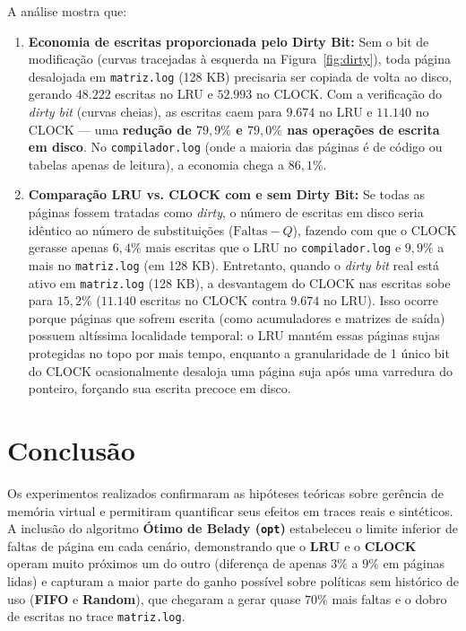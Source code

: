 \documentclass[12pt,a4paper]{article}
\begin{document}
A análise mostra que:
\begin{enumerate}
    \item \textbf{Economia de escritas proporcionada pelo Dirty Bit:} Sem o bit de modificação (curvas tracejadas à esquerda na Figura~\ref{fig:dirty}), toda página desalojada em \texttt{matriz.log} (128 KB) precisaria ser copiada de volta ao disco, gerando $48.222$ escritas no LRU e $52.993$ no CLOCK. Com a verificação do \textit{dirty bit} (curvas cheias), as escritas caem para $9.674$ no LRU e $11.140$ no CLOCK --- uma \textbf{redução de $79,9\%$ e $79,0\%$ nas operações de escrita em disco}. No \texttt{compilador.log} (onde a maioria das páginas é de código ou tabelas apenas de leitura), a economia chega a \textbf{$86,1\%$}.
    \item \textbf{Comparação LRU vs. CLOCK com e sem Dirty Bit:} Se todas as páginas fossem tratadas como \textit{dirty}, o número de escritas em disco seria idêntico ao número de substituições ($\text{Faltas} - Q$), fazendo com que o CLOCK gerasse apenas $6,4\%$ mais escritas que o LRU no \texttt{compilador.log} e $9,9\%$ a mais no \texttt{matriz.log} (em 128 KB). Entretanto, quando o \textit{dirty bit} real está ativo em \texttt{matriz.log} (128 KB), a desvantagem do CLOCK nas escritas sobe para \textbf{$15,2\%$} ($11.140$ escritas no CLOCK contra $9.674$ no LRU). Isso ocorre porque páginas que sofrem escrita (como acumuladores e matrizes de saída) possuem altíssima localidade temporal: o LRU mantém essas páginas sujas protegidas no topo por mais tempo, enquanto a granularidade de 1 único bit do CLOCK ocasionalmente desaloja uma página suja após uma varredura do ponteiro, forçando sua escrita precoce em disco.
\end{enumerate}

\section{Conclusão}

Os experimentos realizados confirmaram as hipóteses teóricas sobre gerência de memória virtual e permitiram quantificar seus efeitos em traces reais e sintéticos. A inclusão do algoritmo \textbf{Ótimo de Belady (\texttt{opt})} estabeleceu o limite inferior de faltas de página em cada cenário, demonstrando que o \textbf{LRU} e o \textbf{CLOCK} operam muito próximos um do outro (diferença de apenas $3\%$ a $9\%$ em páginas lidas) e capturam a maior parte do ganho possível sobre políticas sem histórico de uso (\textbf{FIFO} e \textbf{Random}), que chegaram a gerar quase $70\%$ mais faltas e o dobro de escritas no trace \texttt{matriz.log}.
\end{document}
